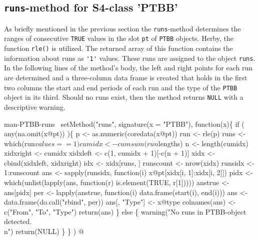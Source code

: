 \documentclass[a4paper]{article}
\begin{document}
\subsection{\texttt{runs}-method for S4-class 'PTBB'}
As briefly mentioned in the previous section the \verb?runs?-method
determines the ranges of consecutive \verb?TRUE? values in the slot
\verb?pt? of \verb?PTBB? objects. Herby, the function \verb?rle()? is
utilized. The returned array of this function contains the information
about runs as \verb?'1'? values. These runs are assigned to the object
\verb?runs?. In the following lines of the method's body, the left and
right points for each run are determined and a three-column data frame
is created that holds in the first two columns the start and end
periods of each run and the type of the \verb?PTBB? object in its third.
Should no runs exist, then the method returns \verb?NULL? with a
descriptive warning.

\nwenddocs{}\endmoddef\let\nwnotused=\nwoutput{}
\LA{}man-PTBB-runs~{\nwtagstyle{}}\RA{}
setMethod("runs",
          signature(x = "PTBB"), function(x)\{
              if ( any(na.omit(x@pt)) )\{
                  p <- as.numeric(coredata(x@pt))
                  run <- rle(p)
                  runs <- which(run$values == 1)
                  cumidx <- cumsum(run$lengths)
                  n <- length(cumidx)
                  xidxright <- cumidx
                  xidxleft <- c(1, cumidx + 1)[-c(n + 1)]
                  xidx <- cbind(xidxleft, xidxright)
                  idx <- xidx[runs, ]
                  runscount <- nrow(xidx)
                  runsidx <- 1:runscount
                  ans <- sapply(runsidx, function(i)
                      x@pt[xidx[i, 1]:xidx[i, 2]])
                  pidx <- which(unlist(lapply(ans, function(r)
                      is.element(TRUE, r[1]))))
                  anstrue <- ans[pidx]
                  per <- lapply(anstrue, function(i)
                      data.frame(start(i), end(i)))
                  ans <- data.frame(do.call("rbind", per))
                  ans[, "Type"] <- x@type
                  colnames(ans) <- c("From", "To", "Type")
                  return(ans)
              \} else \{
                  warning("No runs in PTBB-object detected.\\n")
                  return(NULL)
              \}
          \}
)
\nwnotused{PtbbMethods.R}\nwendcode{}@
\end{document}

